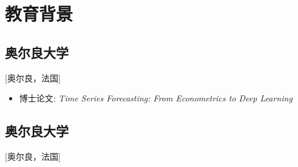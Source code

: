\documentclass{mycv}
\begin{document}
\maketitle



\section{教育背景}

\subsection{\large 奥尔良大学}[奥尔良，法国]

\vspace{0.3em}

\begin{positions}
\end{positions}

\begin{itemize}
  \item 博士论文: \textit{Time Series Forecasting: From Econometrics to Deep Learning}
\end{itemize}

\vspace{-\parskip}

\subsection{\large 奥尔良大学}[奥尔良，法国]

\vspace{0.3em}
\end{document}

